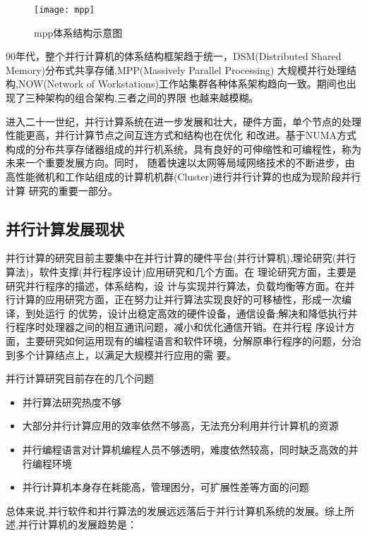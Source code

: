     \begin{figure}[htbp]
    \centering
    \texttt{[image: mpp]}
    \caption{mpp体系结构示意图}\label{fig:mpp}
    \vspace{\baselineskip}
    \end{figure}
    
90年代，整个并行计算机的体系结构框架趋于统一，DSM(Distributed Shared Memory)分布式共享存储,MPP(Massively Parallel Processing)
大规模并行处理结构,NOW(Network of Workstations)工作站集群各种体系架构趋向一致。期间也出现了三种架构的组合架构,三者之间的界限
也越来越模糊。

    进入二十一世纪，并行计算系统在进一步发展和壮大，硬件方面，单个节点的处理性能更高，并行计算节点之间互连方式和结构也在优化
和改进。基于NUMA方式构成的分布共享存储器组成的并行机系统，具有良好的可伸缩性和可编程性，称为未来一个重要发展方向。同时，
随着快速以太网等局域网络技术的不断进步，由高性能微机和工作站组成的计算机机群(Cluster)进行并行计算的也成为现阶段并行计算
研究的重要一部分。

\subsection{并行计算发展现状}
    并行计算的研究目前主要集中在并行计算的硬件平台(并行计算机),理论研究(并行算法)，软件支撑(并行程序设计)应用研究和几个方面。在
理论研究方面，主要是研究并行程序的描述，体系结构，设
计与实现并行算法，负载均衡等方面。在并行计算的应用研究方面，正在努力让并行算法实现良好的可移植性，形成一次编译，到处运行
的优势，设计出稳定高效的硬件设备，通信设备;解决和降低执行并行程序时处理器之间的相互通讯问题，减小和优化通信开销。在并行程
序设计方面，主要研究如何运用现有的编程语言和软件环境，分解原串行程序的问题，分治到多个计算结点上，以满足大规模并行应用的需
要\cite{Chenguoliang}。

    并行计算研究目前存在的几个问题
    \begin{itemize}   
    \item 并行算法研究热度不够
    \item 大部分并行计算应用的效率依然不够高，无法充分利用并行计算机的资源
    \item 并行编程语言对计算机编程人员不够透明，难度依然较高，同时缺乏高效的并行编程环境
    \item 并行计算机本身存在耗能高，管理困分，可扩展性差等方面的问题
    \end{itemize}

总体来说,并行软件和并行算法的发展远远落后于并行计算机系统的发展。综上所述,并行计算机的发展趋势是：


